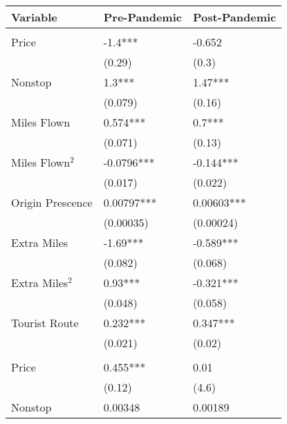 
\begin{tabular}[t]{lll}
\toprule
Variable & Pre-Pandemic & Post-Pandemic\\
\midrule
\addlinespace[0.3em]
\multicolumn{3}{l}{\textbf{Linear Coefficients}}\\
\hspace{1em}Price & -1.4*** & -0.652\\
\hspace{1em} & (0.29) & (0.3)\\
\hspace{1em}Nonstop & 1.3*** & 1.47***\\
\hspace{1em} & (0.079) & (0.16)\\
\hspace{1em}Miles Flown & 0.574*** & 0.7***\\
\hspace{1em} & (0.071) & (0.13)\\
\hspace{1em}Miles Flown$^2$ & -0.0796*** & -0.144***\\
\hspace{1em} & (0.017) & (0.022)\\
\hspace{1em}Origin Prescence & 0.00797*** & 0.00603***\\
\hspace{1em} & (0.00035) & (0.00024)\\
\hspace{1em}Extra Miles & -1.69*** & -0.589***\\
\hspace{1em} & (0.082) & (0.068)\\
\hspace{1em}Extra Miles$^2$ & 0.93*** & -0.321***\\
\hspace{1em} & (0.048) & (0.058)\\
\hspace{1em}Tourist Route & 0.232*** & 0.347***\\
\hspace{1em} & (0.021) & (0.02)\\
\midrule
\addlinespace[0.3em]
\multicolumn{3}{l}{\textbf{Nonlinear Coefficients}}\\
\hspace{1em}Price & 0.455*** & 0.01\\
\hspace{1em} & (0.12) & (4.6)\\
\hspace{1em}Nonstop & 0.00348 & 0.00189\\

\end{tabular}
